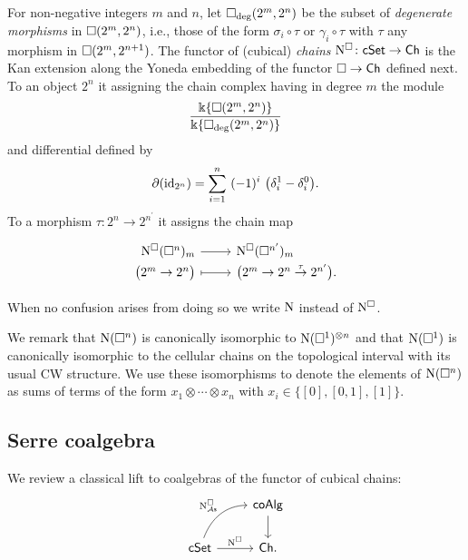 For non-negative integers $m$ and $n$, let $\square_{\deg}(2^m, 2^n)$ be the subset of \textit{degenerate morphisms} in $\square(2^m, 2^n)$, i.e., those of the form $\sigma_i \circ \tau$ or $\gamma_i \circ \tau$ with $\tau$ any morphism in $\square(2^m, 2^{n+1})$.
The functor of (cubical) \textit{chains} $\operatorname{N^{\square}} \colon \mathsf{cSet} \to \mathsf{Ch}$ is the Kan extension along the Yoneda embedding of the functor $\square \to \mathsf{Ch}$ defined next.
To an object $2^n$ it assigning the chain complex having in degree $m$ the module
\[
\frac{\Bbbk\{\square(2^m, 2^n)\}}{\Bbbk\{\square_{\deg}(2^m, 2^n)\}}
\]
and differential defined by
\[
\partial (\id_{2^n}) = \sum_{i=1}^{n} \ (-1)^i \
\big(\delta_i^1 - \delta_i^0 \big).
\]
To a morphism $\tau \colon 2^n \to 2^{n^\prime}$ it assigns the chain map
\[
\begin{tikzcd}[row sep=-3pt, column sep=normal,
/tikz/column 1/.append style={anchor=base east},
/tikz/column 2/.append style={anchor=base west}]
\cchains(\cube^n)_m \arrow[r] &  \cchains(\cube^{n^\prime})_m \\
\big( 2^m \to 2^n \big) \arrow[r, mapsto] & \big( 2^m \to 2^n \stackrel{\tau}{\to} 2^{n^\prime} \big).
\end{tikzcd}
\]

When no confusion arises from doing so we write $\operatorname{N}$ instead of $\operatorname{N^{\square}}$.

We remark that $\operatorname{N}(\square^n)$ is canonically isomorphic to $\operatorname{N}(\square^1)^{\otimes n}$ and that $\operatorname{N}(\square^1)$ is canonically isomorphic to the cellular chains on the topological interval with its usual CW structure.
We use these isomorphisms to denote the elements of $\operatorname{N}(\square^n)$ as sums of terms of the form $x_1 \otimes \cdots \otimes x_n$ with $x_i \in \big\{[0], [0,1], [1] \big\}$.

\subsection{Serre coalgebra} \label{ss:serre coalgebra}

We review a classical lift to coalgebras of the functor of cubical chains:
\[
\begin{tikzcd}
& \coAlg \arrow[d] \\
\cSet \arrow[r, "\cchains"] \arrow[ur, "\cchainsAS", out=70, in=180] & \Ch.
\end{tikzcd}
\]

